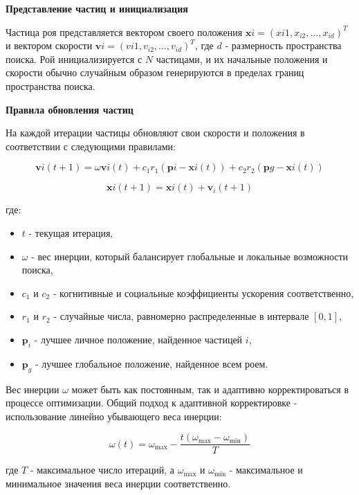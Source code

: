 \textbf{Представление частиц и инициализация}

Частица роя представляется вектором своего положения
$\mathbf{x}i = (x{i1}, x_{i2}, \dots, x_{id})^T$ и вектором скорости
$\mathbf{v}i = (v{i1}, v_{i2}, \dots, v_{id})^T$,
где $d$ - размерность пространства поиска.
Рой инициализируется с $N$ частицами, и их начальные положения
и скорости обычно случайным образом генерируются в пределах
границ пространства поиска.

\textbf{Правила обновления частиц}

На каждой итерации частицы обновляют свои скорости и положения в
соответствии с следующими правилами:

\begin{equation*}
    \mathbf{v}{i}(t+1) = \omega \mathbf{v}{i}(t)
    + c_1 r_1 (\mathbf{p}{i} - \mathbf{x}{i}(t))
    + c_2 r_2 (\mathbf{p}{g} - \mathbf{x}{i}(t))
\end{equation*}

\begin{equation*}
    \mathbf{x}{i}(t+1) = \mathbf{x}{i}(t) + \mathbf{v}_{i}(t+1)
\end{equation*}

где:
\begin{itemize}
    \item $t$ - текущая итерация,
    \item $\omega$ - вес инерции, который балансирует глобальные и локальные возможности поиска,
    \item $c_1$ и $c_2$ - когнитивные и социальные коэффициенты ускорения соответственно,
    \item $r_1$ и $r_2$ - случайные числа, равномерно распределенные в интервале $[0, 1]$,
    \item $\mathbf{p}_i$ - лучшее личное положение, найденное частицей $i$,
    \item $\mathbf{p}_g$ - лучшее глобальное положение, найденное всем роем.
\end{itemize}

Вес инерции $\omega$ может быть как постоянным, так и
адаптивно корректироваться в процессе оптимизации.
Общий подход к адаптивной корректировке - использование
линейно убывающего веса инерции:

\begin{equation*}
    \omega(t) = \omega_{\max} - \frac{t(\omega_{\max}
        - \omega_{\min})}{T}
\end{equation*}

где $T$ - максимальное число итераций, а $\omega_{\max}$
и $\omega_{\min}$ - максимальное и
минимальное значения веса инерции соответственно.

